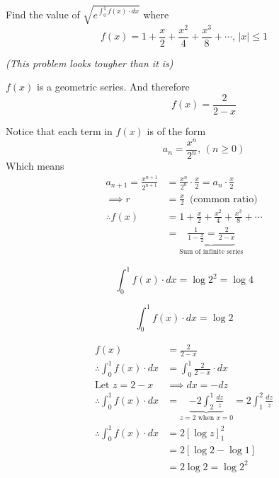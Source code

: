 \documentclass[14pt,fleqn]{extarticle}
\newcommand\fxe{1+\frac{x}{2} + \frac{x^2}{4} + \frac{x^3}{8} + \cdots}
\begin{document}
 
\begin{problem}
	\statement 
    
    Find the value of $\sqrt{e^{\int_0^1 f(x)\cdot dx}}$ where 
    \[ f(x) = \fxe,\, \vert x\vert \leq 1  \]
    
    \textit{(This problem looks tougher than it is)}

	\begin{step}
  \begin{options} 
     \correct 
       
     $f(x)$ is a geometric series. And therefore 
     \[ \qquad\qquad f(x) = \frac{2}{2-x} \]
        
    \end{options} 
     \reason 
     
     Notice that each term in $f(x)$ is of the form 
     \[ \qquad\qquad a_n = \frac{x^n}{2^n},\, \left(n\geq 0 \right)\]
     Which means 
     \begin{align}
     a_{n+1} = \frac{x^{n+1}}{2^{n+1}} &= \frac{x^n}{2^n}\cdot\frac{x}{2} = a_n\cdot\frac{x}{2} \\
     \implies r &= \frac{x}{2}\,\text{ (common ratio)} \\
     \therefore f(x) &= \fxe \\
     &= \underbrace{\frac{1}{1-\frac{x}{2}} = \frac{2}{2-x}}_{\text{Sum of infinite series}}
\end{align}
       
\end{step}

\begin{step}
  \begin{options} 
     \correct 
     
     \[ \int_0^1 f(x)\cdot dx = \log 2^2 = \log 4 \]
       
     \incorrect
     
     \[ \int_0^1 f(x)\cdot dx = \log 2 \]
    \end{options} 
     \reason
     
     \begin{align}
     f(x) &= \frac{2}{2-x} \\
     \therefore \int_0^1 f(x)\cdot dx &= \int_0^1\frac{2}{2-x}\cdot dx \\
     \text{Let } z = 2-x &\implies dx = -dz  \\
     \therefore \int_0^1 f(x)\cdot dx &= \underbrace{-2\int_2^1\frac{dz}{z}}_{z = 2\text{ when } x = 0} = 2\int_1^2\frac{dz}{z} \\
     \therefore \int_0^1 f(x)\cdot dx &= 2 \left[\log z \right]_1^2 \\ 
     &= 2 \left[\log 2 - \log 1 \right] \\
     &= 2\log 2 = \log 2^2 
\end{align} 
       

\end{step}
\end{problem}
\end{document}
